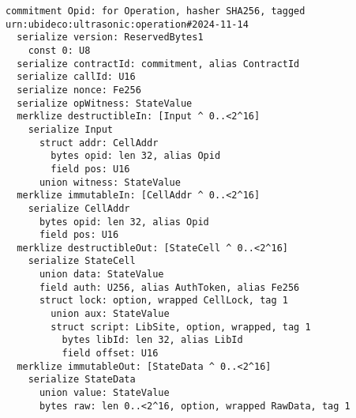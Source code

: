 \documentclass[9pt,oneside]{amsart}
\begin{document}
\begin{verbatim}
commitment Opid: for Operation, hasher SHA256, tagged urn:ubideco:ultrasonic:operation#2024-11-14 
  serialize version: ReservedBytes1
    const 0: U8
  serialize contractId: commitment, alias ContractId
  serialize callId: U16
  serialize nonce: Fe256
  serialize opWitness: StateValue
  merklize destructibleIn: [Input ^ 0..<2^16]
    serialize Input
      struct addr: CellAddr 
        bytes opid: len 32, alias Opid 
        field pos: U16 
      union witness: StateValue 
  merklize immutableIn: [CellAddr ^ 0..<2^16]
    serialize CellAddr
      bytes opid: len 32, alias Opid 
      field pos: U16 
  merklize destructibleOut: [StateCell ^ 0..<2^16]
    serialize StateCell
      union data: StateValue 
      field auth: U256, alias AuthToken, alias Fe256 
      struct lock: option, wrapped CellLock, tag 1 
        union aux: StateValue 
        struct script: LibSite, option, wrapped, tag 1 
          bytes libId: len 32, alias LibId 
          field offset: U16 
  merklize immutableOut: [StateData ^ 0..<2^16]
    serialize StateData
      union value: StateValue
      bytes raw: len 0..<2^16, option, wrapped RawData, tag 1 
\end{verbatim}

\newpage
\section{}\label{ap:gloss}
\printglossaries
\end{document}
